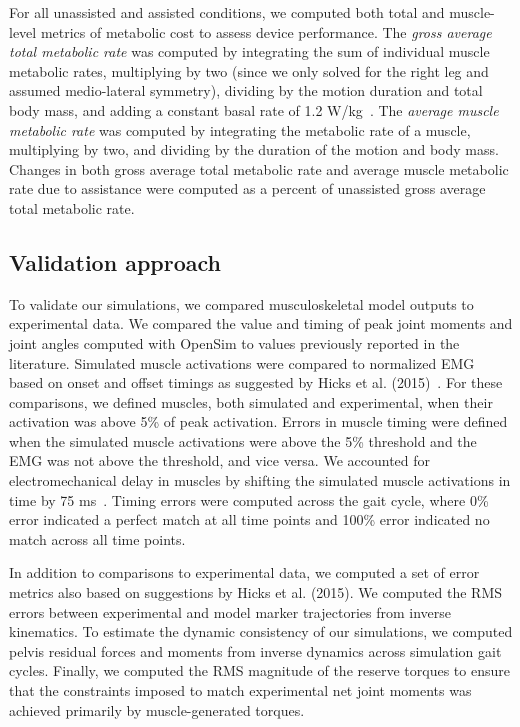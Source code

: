 \documentclass[10pt,letterpaper]{article}
\begin{document}
For all unassisted and assisted conditions, we computed both total and muscle-level metrics of metabolic cost to assess device performance. The \textit{gross average total metabolic rate} was computed by integrating the sum of individual muscle metabolic rates, multiplying by two (since we only solved for the right leg and assumed medio-lateral symmetry), dividing by the motion duration and total body mass, and adding a constant basal rate of 1.2 W/kg~\cite{Umberger:2003}. The \textit{average muscle metabolic rate} was computed by integrating the metabolic rate of a muscle, multiplying by two, and dividing by the duration of the motion and body mass. Changes in both gross average total metabolic rate and average muscle metabolic rate due to assistance were computed as a percent of unassisted gross average total metabolic rate.

\subsection*{Validation approach}
To validate our simulations, we compared musculoskeletal model outputs to experimental data. We compared the value and timing of peak joint moments and joint angles computed with OpenSim to values previously reported in the literature. Simulated muscle activations were compared to normalized EMG based on onset and offset timings as suggested by Hicks et al. (2015)~\cite{Hicks:2015}. For these comparisons, we defined muscles, both simulated and experimental, when their activation was above 5\% of peak activation. Errors in muscle timing were defined when the simulated muscle activations were above the 5\% threshold and the EMG was not above the threshold, and vice versa. We accounted for electromechanical delay in muscles by shifting the simulated muscle activations in time by 75 ms~\cite{SethPandy:2007}. Timing errors were computed across the gait cycle, where 0\% error indicated a perfect match at all time points and 100\% error indicated no match across all time points.

In addition to comparisons to experimental data, we computed a set of error metrics also based on suggestions by Hicks et al. (2015). We computed the RMS errors between experimental and model marker trajectories from inverse kinematics. To estimate the dynamic consistency of our simulations, we computed pelvis residual forces and moments from inverse dynamics across simulation gait cycles. Finally, we computed the RMS magnitude of the reserve torques to ensure that the constraints imposed to match experimental net joint moments was achieved primarily by muscle-generated torques. 
\end{document}

